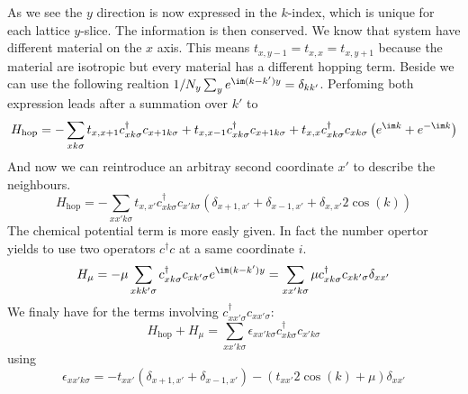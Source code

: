 \documentclass[../main.tex]{subfile}
\begin{document}
As we see the $y$ direction is now expressed in the $k$-index, which is unique for each lattice $y$-slice. The information is then conserved. 
We know that system have different material on the $x$ axis. This means $t_{x,y-1} = t_{x,x} = t_{x,y+1}$ because the material are isotropic but every material has a 
different hopping term. Beside we can use the following realtion $1/N_y \sum_{y} e^{\im (k -  k')y} = \delta_{kk'}$. Perfoming both expression leads after a summation over $k'$ to
\begin{equation*}
    H_{\text{hop}} = -\sum_{x k \sigma} t_{x,x+1} c_{x k\sigma}^{\dagger} c_{x+1 k\sigma} + t_{x,x-1} c_{x k\sigma}^{\dagger} c_{x+1 k\sigma} +  t_{x,x} c_{x k\sigma}^{\dagger} c_{xk\sigma}\left(e^{\im k} + e^{-\im k}\right)
\end{equation*}
And now we can reintroduce an arbitray second coordinate $x'$ to describe the neighbours.
\begin{equation}
    H_{\text{hop}} = -\sum_{xx' k \sigma} t_{x,x'} c_{x k\sigma}^{\dagger} c_{x' k\sigma} \left(\delta_{x+1,x'} + \delta_{x-1,x'} + \delta_{x,x'} 2 \cos(k)\right)
\end{equation}
The chemical potential term is more easly given. In fact the number opertor yields to use two operators $c^{\dagger}c$ at a same coordinate $i$.
\begin{equation}
    H_{\mu} = -\mu \sum_{x kk' \sigma} c_{x k\sigma}^{\dagger} c_{x k'\sigma} e^{\im (k-k')y} = \sum_{xx'k\sigma} \mu c_{xk\sigma}^{\dagger} c_{xk'\sigma} \delta_{xx'}     
\end{equation}
We finaly have for the terms involving $c^{\dagger}_{xx'\sigma} c_{xx'\sigma}$:
\begin{equation*}
    H_{\text{hop}} + H_{\mu} = \sum_{xx'k\sigma} \epsilon_{xx'k\sigma} c_{xk\sigma}^{\dagger} c_{x'k\sigma}
\end{equation*}
using
\[
    \epsilon_{xx'k\sigma}= - t_{xx'} \left(\delta_{x+1, x'} + \delta_{x-1,x'}\right) - \left(t_{xx'}2\cos(k) + \mu\right) \delta_{xx'}
\]
\end{document}
